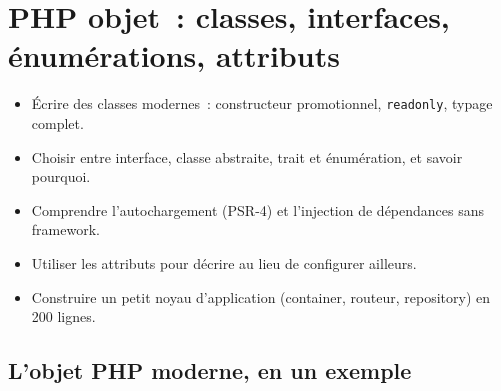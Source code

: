 \documentclass[12pt,a4paper,twoside,openright]{book}
\begin{document}
\chapter{PHP objet~: classes, interfaces, \'enum\'erations, attributs}
\label{ch-php-oop}

\begin{objectif}
\begin{itemize}
  \item \'Ecrire des classes modernes~: constructeur promotionnel, \verb|readonly|, typage complet.
  \item Choisir entre interface, classe abstraite, trait et \'enum\'eration, et savoir pourquoi.
  \item Comprendre l'autochargement (PSR-4) et l'injection de d\'ependances sans framework.
  \item Utiliser les attributs pour d\'ecrire au lieu de configurer ailleurs.
  \item Construire un petit noyau d'application (container, routeur, repository) en 200 lignes.
\end{itemize}
\end{objectif}

\section{L'objet PHP moderne, en un exemple}
\end{document}
